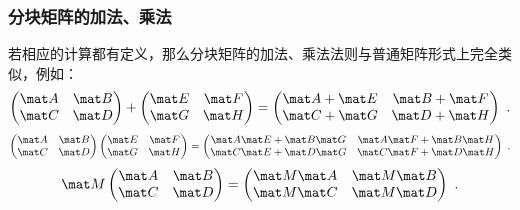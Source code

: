 \subsubsection{分块矩阵的加法、乘法}
若相应的计算都有定义，那么分块矩阵的加法、乘法法则与普通矩阵形式上完全类似，例如：
\begin{equation}
\begin{pmatrix}
\mat A & \mat B\\
\mat C & \mat D\\
\end{pmatrix}
+
\begin{pmatrix}
\mat E & \mat F\\
\mat G & \mat H\\
\end{pmatrix}
=
\begin{pmatrix}
\mat A +\mat E & \mat B +\mat F\\
\mat C +\mat G & \mat D +\mat H\\
\end{pmatrix}~.
\end{equation}
\begin{equation}
\begin{pmatrix}
\mat A & \mat B\\
\mat C & \mat D\\
\end{pmatrix}
\begin{pmatrix}
\mat E & \mat F\\
\mat G & \mat H\\
\end{pmatrix}
=
\begin{pmatrix}
\mat A \mat E +\mat B \mat G & \mat A \mat F +\mat B \mat H \\
\mat C \mat E +\mat D \mat G  & \mat C \mat F +\mat D \mat H \\
\end{pmatrix}~.
\end{equation}
\begin{equation}
\mat M
\begin{pmatrix}
\mat A & \mat B\\
\mat C & \mat D\\
\end{pmatrix}
=
\begin{pmatrix}
\mat M \mat A & \mat M \mat B\\
\mat M \mat C & \mat M \mat D\\
\end{pmatrix}~.
\end{equation}

